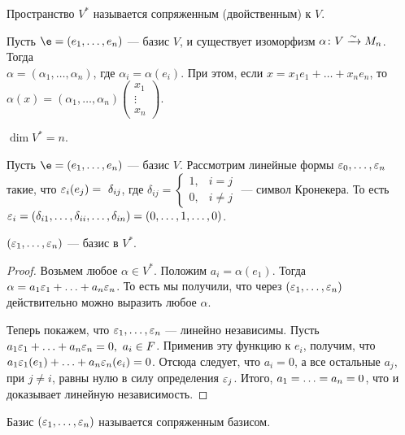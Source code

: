 \begin{Def}
Пространство $V^*$ называется сопряженным (двойственным) к $V$.
\end{Def}

Пусть $\e = (e_1, \ldots, e_n)$ --- базис $V$, и существует изоморфизм $\alpha \colon V \xrightarrow{\sim} M_{n}$. Тогда \\$\alpha= (\alpha_1, \ldots, \alpha_n)$, где $\alpha_i = \alpha(e_i)$. При этом, если $x = x_1e_1 + \ldots + x_ne_n$, то $\alpha(x) = (\alpha_1, \ldots, \alpha_n)\begin{pmatrix}x_1\\ \vdots \\ x_n\end{pmatrix}$.

\begin{Consequence}
$\dim V^* = n$.
\end{Consequence}

Пусть $\e = (e_1, \ldots, e_n)$ --- базис $V$. Рассмотрим линейные формы $\varepsilon_0, \ldots, \varepsilon_n$ такие, что $\varepsilon_i(e_j) =~\delta_{ij}$, где $\delta_{ij} =
\begin{cases}
1, & i = j \\
0, & i \neq j
\end{cases}
$ --- символ Кронекера. То есть $\varepsilon_i = (\delta_{i1}, \ldots, \delta_{ii}, \ldots, \delta_{in}) = (0, \ldots, 1, \ldots, 0)$.

\begin{Suggestion}
$(\varepsilon_1, \ldots, \varepsilon_n)$ --- базис в $V^*$.
\end{Suggestion}

\begin{proof}
Возьмем любое $\alpha \in V^*$. Положим $a_i = \alpha(e_1)$. Тогда $\alpha = a_1\varepsilon_1 + \ldots + a_n\varepsilon_n$. То есть мы получили, что через $(\varepsilon_1, \ldots, \varepsilon_n)$ действительно можно выразить любое $\alpha$.

Теперь покажем, что $\varepsilon_1, \ldots, \varepsilon_n$ --- линейно независимы. Пусть $a_1\varepsilon_1 + \ldots + a_n\varepsilon_n = 0,\ a_i \in F$. Применив эту функцию к $e_i$, получим, что $a_1\varepsilon_1(e_1) + \ldots + a_n\varepsilon_n(e_i) = 0$. Отсюда следует, что $a_i = 0$, а все остальные $a_j$, при $j \neq i$, равны нулю в силу определения $\varepsilon_j$. Итого, $a_1 = \ldots \hm= a_n = 0$, что и доказывает линейную независимость.
\end{proof}

\begin{Def}
Базис $(\varepsilon_1, \ldots, \varepsilon_n)$ называется сопряженным базисом.
\end{Def}

